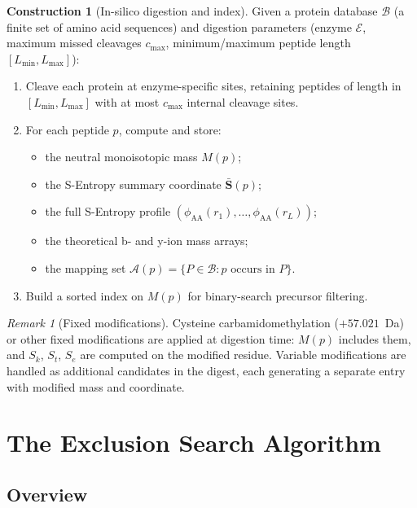 \documentclass[11pt,a4paper]{article}
\theoremstyle{definition}
\newtheorem{construction}[theorem]{Construction}
\theoremstyle{remark}
\newtheorem{remark}[theorem]{Remark}
\newcommand{\amb}{\mathcal{A}}
\newcommand{\Sk}{S_k}
\newcommand{\St}{S_t}
\newcommand{\Se}{S_e}
\newcommand{\Scoord}{\mathbf{S}}
\newcommand{\DB}{\mathcal{B}}
\begin{document}
\begin{construction}[In-silico digestion and index]
\label{con:digest}
Given a protein database $\DB$ (a finite set of amino acid sequences)
and digestion parameters (enzyme $\mathcal{E}$, maximum missed
cleavages $c_{\max}$, minimum/maximum peptide length $[L_{\min},L_{\max}]$):
\begin{enumerate}[leftmargin=2.0em,itemsep=1pt]
  \item Cleave each protein at enzyme-specific sites, retaining
  peptides of length in $[L_{\min},L_{\max}]$ with at most
  $c_{\max}$ internal cleavage sites.
  \item For each peptide $p$, compute and store:
  \begin{itemize}[itemsep=1pt]
    \item the neutral monoisotopic mass $M(p)$;
    \item the S-Entropy summary coordinate $\bar{\Scoord}(p)$;
    \item the full S-Entropy profile
    $(\phi_{\mathrm{AA}}(r_1),\dots,\phi_{\mathrm{AA}}(r_L))$;
    \item the theoretical b- and y-ion mass arrays;
    \item the mapping set $\amb(p)=\{P\in\DB : p\text{ occurs in }P\}$.
  \end{itemize}
  \item Build a sorted index on $M(p)$ for binary-search precursor
  filtering.
\end{enumerate}
\end{construction}

\begin{remark}[Fixed modifications]
Cysteine carbamidomethylation ($+57.021$~Da) or other fixed
modifications are applied at digestion time: $M(p)$ includes
them, and $\Sk$, $\St$, $\Se$ are computed on the modified residue.
Variable modifications are handled as additional candidates in the
digest, each generating a separate entry with modified mass and
coordinate.
\end{remark}

\section{The Exclusion Search Algorithm}
\label{sec:algorithm}

\subsection{Overview}
\end{document}
